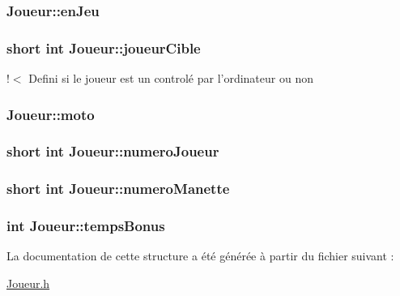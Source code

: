 \hypertarget{structJoueur_a83e062c54d98b446e0bb30a93d23f2fd}{
\subsubsection[{en\-Jeu}]{ Joueur\-::en\-Jeu}}\label{structJoueur_a83e062c54d98b446e0bb30a93d23f2fd}
\hypertarget{structJoueur_a7672ceecb63c257cf2d9a659662620fc}{
\subsubsection[{joueur\-Cible}]{\setlength{\rightskip}{0pt plus 5cm}short int Joueur\-::joueur\-Cible}}\label{structJoueur_a7672ceecb63c257cf2d9a659662620fc}
!$<$ Defini si le joueur est un controlé par l'ordinateur ou non \hypertarget{structJoueur_ac2768294956259e01d0744d6db789fe2}{
\subsubsection[{moto}]{ Joueur\-::moto}}\label{structJoueur_ac2768294956259e01d0744d6db789fe2}
\hypertarget{structJoueur_a16d5323b40b813198386623075de9fa1}{
\subsubsection[{numero\-Joueur}]{\setlength{\rightskip}{0pt plus 5cm}short int Joueur\-::numero\-Joueur}}\label{structJoueur_a16d5323b40b813198386623075de9fa1}
\hypertarget{structJoueur_aab4fb5652b29a6bdfc5dff4ed4dbe8da}{
\subsubsection[{numero\-Manette}]{\setlength{\rightskip}{0pt plus 5cm}short int Joueur\-::numero\-Manette}}\label{structJoueur_aab4fb5652b29a6bdfc5dff4ed4dbe8da}
\hypertarget{structJoueur_a924a294aef342302f978bc900cfdb98a}{
\subsubsection[{temps\-Bonus}]{\setlength{\rightskip}{0pt plus 5cm}int Joueur\-::temps\-Bonus}}\label{structJoueur_a924a294aef342302f978bc900cfdb98a}


La documentation de cette structure a été générée à partir du fichier suivant \-:\begin{DoxyCompactItemize}
\item 
\hyperlink{Joueur_8h}{Joueur.\-h}\end{DoxyCompactItemize}
